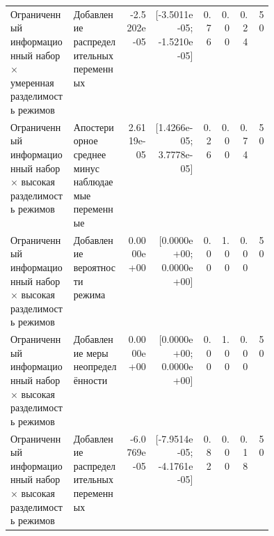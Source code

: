 \begin{tabular}{p{0.24\linewidth}p{0.20\linewidth}rrrrrr}
Ограниченный информационный набор × умеренная разделимость режимов & Добавление распределительных переменных & -2.5202e-05 & [-3.5011e-05; -1.5210e-05] & 0.76 & 0.00 & 0.24 & 50 \\
Ограниченный информационный набор × высокая разделимость режимов & Апостериорное среднее минус наблюдаемые переменные & 2.6119e-05 & [1.4266e-05; 3.7778e-05] & 0.26 & 0.00 & 0.74 & 50 \\
Ограниченный информационный набор × высокая разделимость режимов & Добавление вероятности режима & 0.0000e+00 & [0.0000e+00; 0.0000e+00] & 0.00 & 1.00 & 0.00 & 50 \\
Ограниченный информационный набор × высокая разделимость режимов & Добавление меры неопределённости & 0.0000e+00 & [0.0000e+00; 0.0000e+00] & 0.00 & 1.00 & 0.00 & 50 \\
Ограниченный информационный набор × высокая разделимость режимов & Добавление распределительных переменных & -6.0769e-05 & [-7.9514e-05; -4.1761e-05] & 0.82 & 0.00 & 0.18 & 50 \\
\bottomrule
\end{tabular}